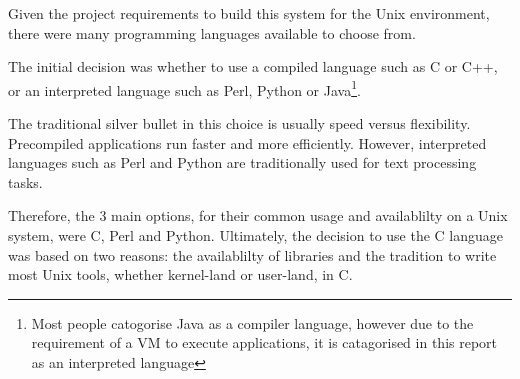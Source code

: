 
Given the project requirements to build this system for the Unix
environment, there were many programming languages available to choose
from.


The initial decision was whether to use a compiled language such as C or
C++, or an interpreted language such as Perl, Python or
Java\footnote{Most people catogorise Java as a compiler language,
however due to the requirement of a VM to execute applications, it is
catagorised in this report as an interpreted language}. 


The traditional silver bullet in this choice is usually speed versus 
flexibility. Precompiled applications run faster and more efficiently. 
However, interpreted languages such as Perl and Python are traditionally
used for text processing tasks. 


Therefore, the 3 main options, for their common usage and availablilty 
on a Unix system, were C, Perl and Python. Ultimately, the decision to 
use the C language was based on two reasons: the availablilty of 
libraries and the tradition to write most Unix tools, whether 
kernel-land or user-land, in C.
